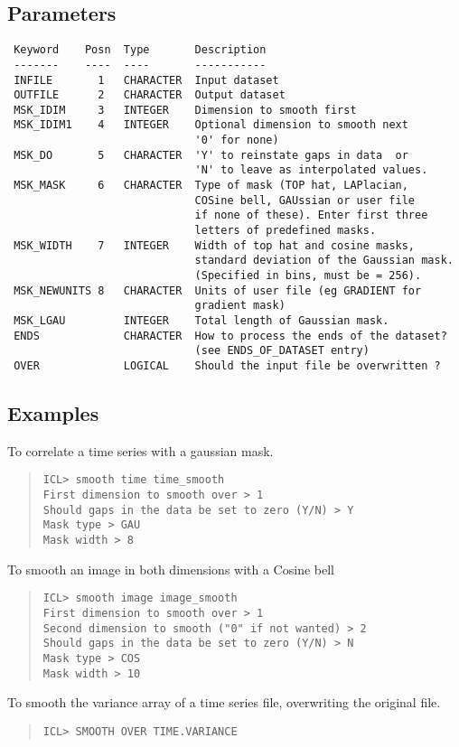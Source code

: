 \documentclass{book}
\renewcommand{\_}{{\tt\char'137}}     %
\begin{document}
\subsection{Parameters}
\begin{verbatim}
 Keyword    Posn  Type       Description
 -------    ----  ----       -----------
 INFILE       1   CHARACTER  Input dataset
 OUTFILE      2   CHARACTER  Output dataset
 MSK_IDIM     3   INTEGER    Dimension to smooth first
 MSK_IDIM1    4   INTEGER    Optional dimension to smooth next
                             '0' for none)
 MSK_DO       5   CHARACTER  'Y' to reinstate gaps in data  or
                             'N' to leave as interpolated values.
 MSK_MASK     6   CHARACTER  Type of mask (TOP hat, LAPlacian,
                             COSine bell, GAUssian or user file
                             if none of these). Enter first three
                             letters of predefined masks.
 MSK_WIDTH    7   INTEGER    Width of top hat and cosine masks,
                             standard deviation of the Gaussian mask.
                             (Specified in bins, must be = 256).
 MSK_NEWUNITS 8   CHARACTER  Units of user file (eg GRADIENT for
                             gradient mask)
 MSK_LGAU         INTEGER    Total length of Gaussian mask.
 ENDS             CHARACTER  How to process the ends of the dataset?
                             (see ENDS_OF_DATASET entry)
 OVER             LOGICAL    Should the input file be overwritten ?

\end{verbatim}\subsection{Examples}
To correlate a time series with a gaussian mask.
\begin{quote}\begin{verbatim}
ICL> smooth time time_smooth
First dimension to smooth over > 1
Should gaps in the data be set to zero (Y/N) > Y
Mask type > GAU
Mask width > 8
\end{verbatim}\end{quote}
To smooth an image in both dimensions with a Cosine bell
\begin{quote}\begin{verbatim}
ICL> smooth image image_smooth
First dimension to smooth over > 1
Second dimension to smooth ("0" if not wanted) > 2
Should gaps in the data be set to zero (Y/N) > N
Mask type > COS
Mask width > 10
\end{verbatim}\end{quote}
To smooth the variance array of a time series file, overwriting
the original file.
\begin{quote}\begin{verbatim}
ICL> SMOOTH OVER TIME.VARIANCE
\end{verbatim}\end{quote}
\end{document}
